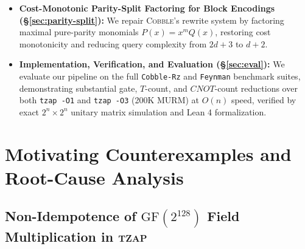 \documentclass[11pt,a4paper]{article}
\theoremstyle{definition}
\begin{document}
\begin{itemize}
  \item \textbf{Cost-Monotonic Parity-Split Factoring for Block Encodings (\S\ref{sec:parity-split}):} We repair \textsc{Cobble}'s rewrite system by factoring maximal pure-parity monomials $P(x) = x^m Q(x)$, restoring cost monotonicity and reducing query complexity from $2d+3$ to $d+2$.
  \item \textbf{Implementation, Verification, and Evaluation (\S\ref{sec:eval}):} We evaluate our pipeline on the full \texttt{Cobble-Rz} and \texttt{Feynman} benchmark suites, demonstrating substantial gate, $T$-count, and $\mathit{CNOT}$-count reductions over both \texttt{tzap -O1} and \texttt{tzap -O3} (200K MURM) at $O(n)$ speed, verified by exact $2^n \times 2^n$ unitary matrix simulation and Lean 4 formalization.
\end{itemize}

\section{Motivating Counterexamples and Root-Cause Analysis}
\label{sec:counterexamples}

\subsection{Non-Idempotence of $\mathrm{GF}(2^{128})$ Field Multiplication in \textsc{tzap}}
\label{sec:gf128-flaw}
\end{document}

